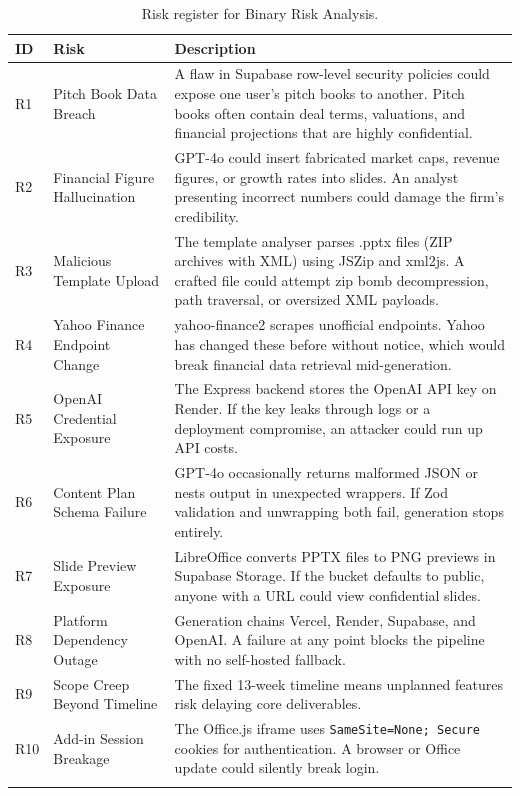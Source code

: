 \begin{longtable}{|l|p{3cm}|p{9cm}|}
\hline
\rowcolor{gray!20} \textbf{ID} & \textbf{Risk} & \textbf{Description} \\
\hline
R1 & Pitch Book Data Breach & A flaw in Supabase row-level security policies could expose one user's pitch books to another. Pitch books often contain deal terms, valuations, and financial projections that are highly confidential. \\
\hline
R2 & Financial Figure Hallucination & GPT-4o could insert fabricated market caps, revenue figures, or growth rates into slides. An analyst presenting incorrect numbers could damage the firm's credibility. \\
\hline
R3 & Malicious Template Upload & The template analyser parses .pptx files (ZIP archives with XML) using JSZip and xml2js. A crafted file could attempt zip bomb decompression, path traversal, or oversized XML payloads. \\
\hline
R4 & Yahoo Finance Endpoint Change & yahoo-finance2 scrapes unofficial endpoints. Yahoo has changed these before without notice, which would break financial data retrieval mid-generation. \\
\hline
R5 & OpenAI Credential Exposure & The Express backend stores the OpenAI API key on Render. If the key leaks through logs or a deployment compromise, an attacker could run up API costs. \\
\hline
R6 & Content Plan Schema Failure & GPT-4o occasionally returns malformed JSON or nests output in unexpected wrappers. If Zod validation and unwrapping both fail, generation stops entirely. \\
\hline
R7 & Slide Preview Exposure & LibreOffice converts PPTX files to PNG previews in Supabase Storage. If the bucket defaults to public, anyone with a URL could view confidential slides. \\
\hline
R8 & Platform Dependency Outage & Generation chains Vercel, Render, Supabase, and OpenAI. A failure at any point blocks the pipeline with no self-hosted fallback. \\
\hline
R9 & Scope Creep Beyond Timeline & The fixed 13-week timeline means unplanned features risk delaying core deliverables. \\
\hline
R10 & Add-in Session Breakage & The Office.js iframe uses \texttt{SameSite=None; Secure} cookies for authentication. A browser or Office update could silently break login. \\
\hline
\caption{Risk register for Binary Risk Analysis.}
\label{tab:bra-register}
\end{longtable}

